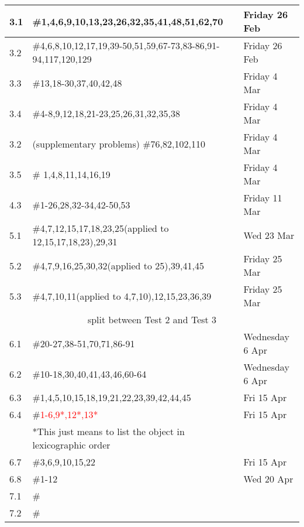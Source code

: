 \documentclass[11pt]{article}
\begin{document}
\begin{tabular}{|p{1.6cm}|p{12cm}|p{3cm}|}
\hline
3.1&\#1,4,6,9,10,13,23,26,32,35,41,48,51,62,70& Friday 26 Feb\\
\hline
3.2&\#4,6,8,10,12,17,19,39-50,51,59,67-73,83-86,91-94,117,120,129&Friday 26 Feb\\
\hline
3.3&\#13,18-30,37,40,42,48&Friday 4 Mar\\
\hline
3.4&\#4-8,9,12,18,21-23,25,26,31,32,35,38&Friday 4 Mar\\
\hline
3.2&(supplementary problems) \#76,82,102,110&Friday 4 Mar\\
\hline
3.5&\# 1,4,8,11,14,16,19& Friday 4 Mar\\
\hline
4.3& \#1-26,28,32-34,42-50,53& Friday 11 Mar\\
\hline
5.1&\#4,7,12,15,17,18,23,25(applied to 12,15,17,18,23),29,31& Wed 23 Mar\\
\hline
5.2&\#4,7,9,16,25,30,32(applied to 25),39,41,45&Friday 25 Mar\\
\hline
5.3&\#4,7,10,11(applied to 4,7,10),12,15,23,36,39&Friday 25 Mar\\
\hline
\hline
\multicolumn{3}{c}{split between Test 2 and Test 3}\\
\hline
6.1&\#20-27,38-51,70,71,86-91&Wednesday 6 Apr\\
\hline
6.2& \#10-18,30,40,41,43,46,60-64& Wednesday 6 Apr\\
\hline
6.3&\#1,4,5,10,15,18,19,21,22,23,39,42,44,45& Fri 15 Apr\\
\hline
6.4&\#\textcolor{red}{1-6,9*,12*,13*}&Fri 15 Apr\\
&*This just means to list the object in lexicographic order& \\
\hline
6.7& \#3,6,9,10,15,22 & Fri 15 Apr \\
\hline
6.8&\#1-12& Wed 20 Apr \\
\hline
7.1&\#&\\
\hline
7.2&\#&\\
\hline
\end{tabular}
\end{document}
